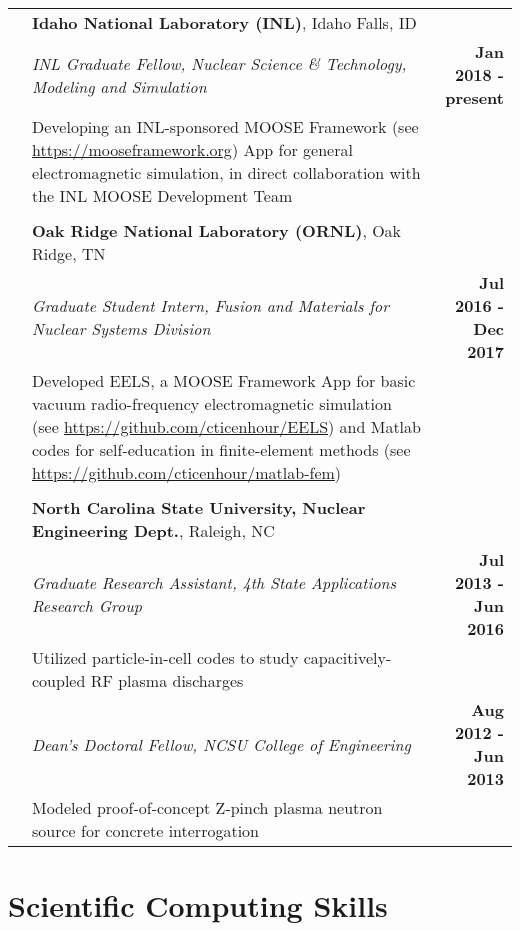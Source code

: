 \documentclass{article}
\begin{document}
	\begin{tabularx}{\textwidth}{l X r}
		\hspace{2em} & \textbf{Idaho National Laboratory (INL)}, Idaho Falls, ID & \\
					 & \textit{INL Graduate Fellow, Nuclear Science \& Technology, Modeling and Simulation} & \textbf{Jan 2018 - present} \\
					 & Developing an INL-sponsored MOOSE Framework (see \url{https://mooseframework.org}) App for general electromagnetic simulation, in direct collaboration with the INL MOOSE Development Team & \\
					 & & \\
					 & \textbf{Oak Ridge National Laboratory (ORNL)}, Oak Ridge, TN & \\
					 & \textit{Graduate Student Intern, Fusion and Materials for Nuclear Systems Division} & \textbf{Jul 2016 - Dec 2017} \\
					 & Developed EELS, a MOOSE Framework App for basic vacuum radio-frequency electromagnetic simulation (see \url{https://github.com/cticenhour/EELS}) and Matlab codes for self-education in finite-element methods (see \url{https://github.com/cticenhour/matlab-fem})& \\					 
					 & & \\
					 & \textbf{North Carolina State University, Nuclear Engineering Dept.}, Raleigh, NC & \\
					 & \textit{Graduate Research Assistant, 4th State Applications Research Group} & \textbf{Jul 2013 - Jun 2016} \\
					 & \hspace{1em} Utilized particle-in-cell codes to study capacitively-coupled RF plasma discharges & \\
					 & \textit{Dean's Doctoral Fellow, NCSU College of Engineering} & \textbf{Aug 2012 - Jun 2013} \\
					 & \hspace{1em} Modeled proof-of-concept Z-pinch plasma neutron source for concrete interrogation & \\
	\end{tabularx}

\section*{Scientific Computing Skills}
\end{document}
